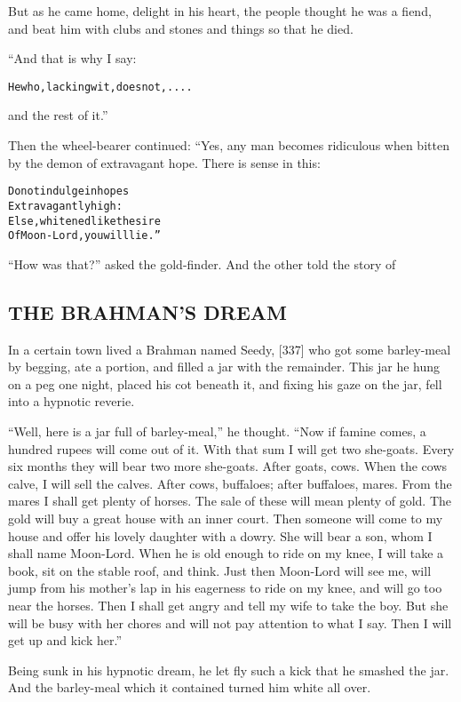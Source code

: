 \documentclass{article}
\renewenvironment{verbatim}{\begin{alltt}\normalfont\begin{centering}}{\end{centering}\end{alltt}}
\begin{document}
But as he came home, delight in his heart, the people thought he
was a fiend, and beat him with clubs and stones and things so that
he died.

“And that is why I say:

\begin{verbatim}
He who, lacking wit, does not,....
\end{verbatim}
and the rest of it.”

Then the wheel-bearer continued: “Yes, any man becomes ridiculous
when bitten by the demon of extravagant hope. There is sense in
this:

\begin{verbatim}
Do not indulge in hopes
    Extravagantly high:
Else, whitened like the sire
    Of Moon-Lord, you will lie.”
\end{verbatim}
``How was that?'' asked the gold-finder. And the other told the
story of

\subsection{THE BRAHMAN'S DREAM}

In a certain town lived a Brahman named Seedy, [337] who got some
barley-meal by begging, ate a portion, and filled a jar with the
remainder. This jar he hung on a peg one night, placed his cot
beneath it, and fixing his gaze on the jar, fell into a hypnotic
reverie.

``Well, here is a jar full of barley-meal,'' he thought.
``Now if famine comes, a hundred rupees will come out of it. With that sum I will get two she-goats. Every six months they will bear two more she-goats. After goats, cows. When the cows calve, I will sell the calves. After cows, buffaloes; after buffaloes, mares. From the mares I shall get plenty of horses. The sale of these will mean plenty of gold. The gold will buy a great house with an inner court. Then someone will come to my house and offer his lovely daughter with a dowry. She will bear a son, whom I shall name Moon-Lord. When he is old enough to ride on my knee, I will take a book, sit on the stable roof, and think. Just then Moon-Lord will see me, will jump from his mother's lap in his eagerness to ride on my knee, and will go too near the horses. Then I shall get angry and tell my wife to take the boy. But she will be busy with her chores and will not pay attention to what I say. Then I will get up and kick her.''

Being sunk in his hypnotic dream, he let fly such a kick that he
smashed the jar. And the barley-meal which it contained turned him
white all over.
\end{document}
